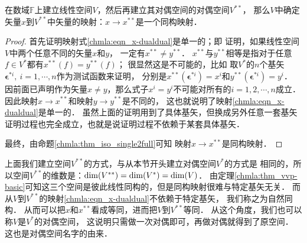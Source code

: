 \begin{theorem}\label{chmla:thm_vvss_zrtg}
    在数域$\mathbb{F}$上建立线性空间$V$，然后再建立其对偶空间的对偶空间$V^{**}$，
    那么$V$中确定矢量$x$到$V^{**}$中矢量的映射：$x \to x^{**}$是一个同构映射．
\end{theorem}
\begin{proof}
    首先证明映射式\eqref{chmla:eqn_x-dualdual}是单一的；即
    证明，如果线性空间$V$中两个任意不同的矢量$x$和$y$，
    一定有$x^{**} \neq y^{**}$．%
    $x^{**}$与$y^{**}$相等是指对于任意$f\in V^*$都有$x^{**}(f) = y^{**}(f)$；
    很显然这是不可能的，比如
    取$V^*$的$n$个基矢$\boldsymbol{\epsilon}^{*i}, \ i=1,\cdots,n$作为测试函数来证明，
    分别是$x^{**}(\boldsymbol{\epsilon}^{*i})=x^i$和$y^{**}(\boldsymbol{\epsilon}^{*i})=y^i$．
    因前面已声明作为矢量$x\neq y$，那么式子$x^i=y^i$不可能对所有的$i=1,2,\cdots,n$成立．
    因此映射$x\to x^{**}$和映射$y\to y^{**}$是不同的，
    这也就说明了映射\eqref{chmla:eqn_x-dualdual}是单一的．
    虽然上面的证明用到了具体基矢，但换成另外任意一套基矢
    证明过程也完全成立，也就是说证明过程不依赖于某套具体基矢．

    最终，由命题\ref{chmla:thm_iso_single2full}可知
    映射$x \to x^{**}$是同构映射．
\end{proof}
    上面我们建立空间$V^{**}$的方式，与从本节开头建立对偶空间$V^{*}$的方式是
相同的，所以空间$V^{**}$的维数是：${\rm dim}(V^{**})={\rm dim}(V^{*})={\rm dim}(V)$．
由定理\ref{chmla:thm_vvp-basic}可知这三个空间是彼此线性同构的，但是同构映射很难与特定基矢无关．
而从$V$到$V^{**}$的映射\eqref{chmla:eqn_x-dualdual}不依赖于特定基矢，
我们称之为{\heiti 自然同构}．
从而可以把$x$和$x^{**}$看成等同，进而把$V$到$V^{**}$等同．
从这个角度，我们也可以称$V$是$V^*$的对偶空间，
这说明只需做一次对偶即可，再做对偶就得到了原空间．
这也是对偶空间名字的由来．

